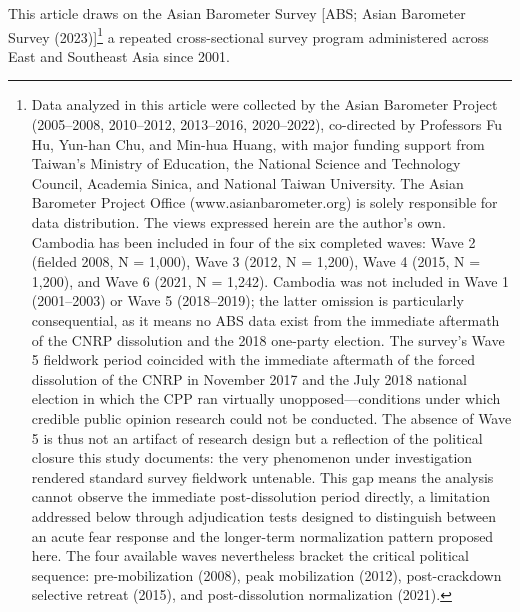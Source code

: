 \documentclass[Review,times,sageh,doublespace]{sagej}
\begin{document}
This article draws on the Asian Barometer Survey {[}ABS; Asian Barometer
Survey (2023){]}\footnote{Data analyzed in this article were collected
  by the Asian Barometer Project (2005--2008, 2010--2012, 2013--2016,
  2020--2022), co-directed by Professors Fu Hu, Yun-han Chu, and Min-hua
  Huang, with major funding support from Taiwan's Ministry of Education,
  the National Science and Technology Council, Academia Sinica, and
  National Taiwan University. The Asian Barometer Project Office
  (www.asianbarometer.org) is solely responsible for data distribution.
  The views expressed herein are the author's own. Cambodia has been
  included in four of the six completed waves: Wave 2 (fielded 2008, N =
  1,000), Wave 3 (2012, N = 1,200), Wave 4 (2015, N = 1,200), and Wave 6
  (2021, N = 1,242). Cambodia was not included in Wave 1 (2001--2003) or
  Wave 5 (2018--2019); the latter omission is particularly
  consequential, as it means no ABS data exist from the immediate
  aftermath of the CNRP dissolution and the 2018 one-party election. The
  survey's Wave 5 fieldwork period coincided with the immediate
  aftermath of the forced dissolution of the CNRP in November 2017 and
  the July 2018 national election in which the CPP ran virtually
  unopposed---conditions under which credible public opinion research
  could not be conducted. The absence of Wave 5 is thus not an artifact
  of research design but a reflection of the political closure this
  study documents: the very phenomenon under investigation rendered
  standard survey fieldwork untenable. This gap means the analysis
  cannot observe the immediate post-dissolution period directly, a
  limitation addressed below through adjudication tests designed to
  distinguish between an acute fear response and the longer-term
  normalization pattern proposed here. The four available waves
  nevertheless bracket the critical political sequence: pre-mobilization
  (2008), peak mobilization (2012), post-crackdown selective retreat
  (2015), and post-dissolution normalization (2021).} a repeated
cross-sectional survey program administered across East and Southeast
Asia since 2001.
\end{document}
